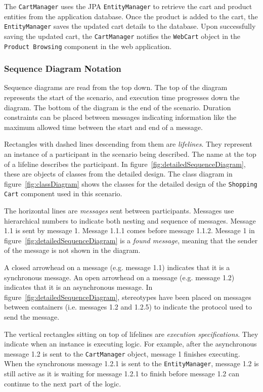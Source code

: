 The \texttt{CartManager} uses the JPA \texttt{EntityManager} to retrieve the cart and product entities from the application database.
Once the product is added to the cart, the \texttt{EntityManager} saves the updated cart details to the database.
Upon successfully saving the updated cart, the \texttt{CartManager} notifies the \texttt{WebCart} object
in the \texttt{Product Browsing} component in the web application.

\subsubsection{Sequence Diagram Notation}
Sequence diagrams are read from the top down.
The top of the diagram represents the start of the scenario, and execution time progresses down the diagram.
The bottom of the diagram is the end of the scenario.
Duration constraints can be placed between messages indicating information like the maximum allowed time between the start and end of a message.

Rectangles with dashed lines descending from them are \emph{lifelines}.
They represent an instance of a participant in the scenario being described.
The name at the top of a lifeline describes the participant.
In figure~\ref{fig:detailedSequenceDiagram}, these are objects of classes from the detailed design.
The class diagram in figure~\ref{fig:classDiagram} shows the classes for the detailed design of the \texttt{Shopping Cart} component used in this scenario.

The horizontal lines are \emph{messages} sent between participants.
Messages use hierarchical numbers to indicate both nesting and sequence of messages.
Message 1.1 is sent by message 1. Message 1.1.1 comes before message 1.1.2.
Message 1 in figure~\ref{fig:detailedSequenceDiagram} is a \emph{found message},
meaning that the sender of the message is not shown in the diagram.

A closed arrowhead on a message (e.g. message 1.1) indicates that it is a synchronous message.
An open arrowhead on a message (e.g. message 1.2) indicates that it is an asynchronous message.
In figure~\ref{fig:detailedSequenceDiagram}, stereotypes have been placed on messages between containers
(i.e. messages 1.2 and 1.2.5) to indicate the protocol used to send the message.

The vertical rectangles sitting on top of lifelines are \emph{execution specifications}.
They indicate when an instance is executing logic.
For example, after the asynchronous message 1.2 is sent to the \texttt{CartManager} object,
message 1 finishes executing.
When the synchronous message 1.2.1 is sent to the \texttt{EntityManager}, message 1.2 is still active
as it is waiting for message 1.2.1 to finish before message 1.2 can continue to the next part of the logic.

